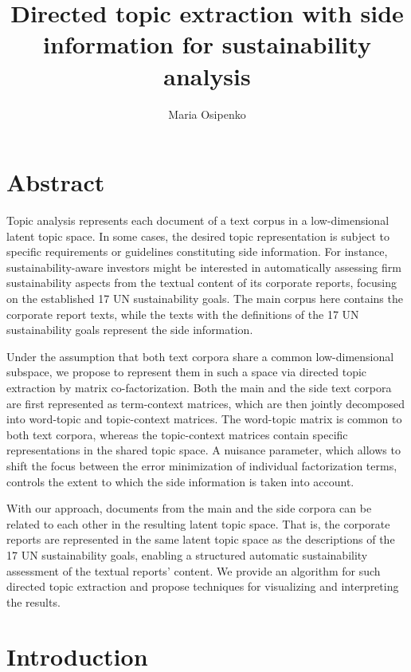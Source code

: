 \documentclass[
]{article}
\title{Directed topic extraction with side information for sustainability analysis}
\author{Maria Osipenko}
\date{}
\begin{document}
\maketitle

\hypertarget{abstract}{%
\section*{Abstract}\label{abstract}}

Topic analysis represents each document of a text corpus in a low-dimensional latent topic space. In some cases, the desired topic representation is subject to specific requirements or guidelines constituting side information. For instance, sustainability-aware investors might be interested in automatically assessing firm sustainability aspects from the textual content of its corporate reports, focusing on the established 17 UN sustainability goals. The main corpus here contains the corporate report texts, while the texts with the definitions of the 17 UN sustainability goals represent the side information.

Under the assumption that both text corpora share a common low-dimensional subspace, we propose to represent them in such a space via directed topic extraction by matrix co-factorization. Both the main and the side text corpora are first represented as term-context matrices, which are then jointly decomposed into word-topic and topic-context matrices. The word-topic matrix is common to both text corpora, whereas the topic-context matrices contain specific representations in the shared topic space. A nuisance parameter, which allows to shift the focus between the error minimization of individual factorization terms, controls the extent to which the side information is taken into account.

With our approach, documents from the main and the side corpora can be related to each other in the resulting latent topic space. That is, the corporate reports are represented in the same latent topic space as the descriptions of the 17 UN sustainability goals, enabling a structured automatic sustainability assessment of the textual reports' content. We provide an algorithm for such directed topic extraction and propose techniques for visualizing and interpreting the results.

\hypertarget{introduction}{%
\section{Introduction}\label{introduction}}
\end{document}
